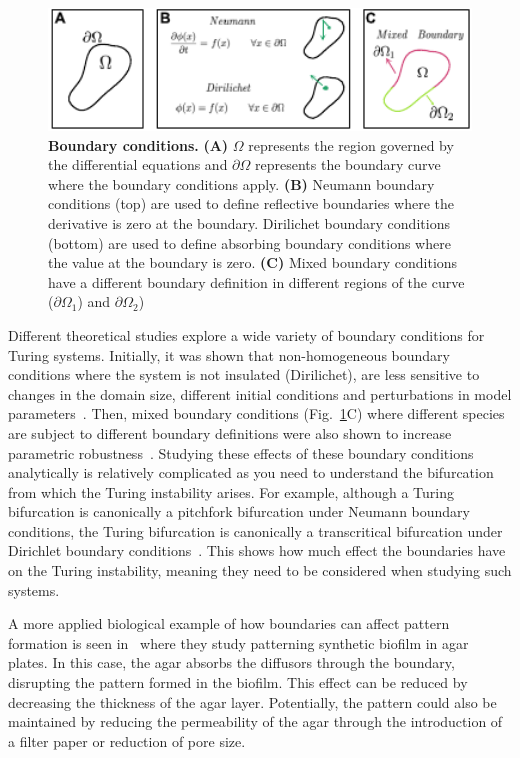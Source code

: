 \begin{figure}[H]
    \centering
    \includegraphics[width=1\textwidth]{chapters/Introduction/boundaries}
    \caption{\textbf{Boundary conditions.} \textbf{(A)} $\Omega$ represents the region governed by the differential equations and $\partial\Omega$ represents the boundary curve where the boundary conditions apply. \textbf{(B)} Neumann boundary conditions (top) are used to define reflective boundaries where the derivative is zero at the boundary. Dirilichet boundary conditions (bottom) are used to define absorbing boundary conditions where the value at the boundary is zero. \textbf{(C)} Mixed boundary conditions have a different boundary definition in different regions of the curve ($\partial\Omega_1$) and $\partial\Omega_2$)  }
    \label{fig:boundaries}
\end{figure}

Different theoretical studies explore a wide variety of boundary conditions for Turing systems.
Initially, it was shown that non-homogeneous boundary conditions where the system is not insulated (Dirilichet), are less sensitive to changes in the domain size, different initial conditions and perturbations in model parameters~\parencite{Arcuri1986}.
Then, mixed boundary conditions (Fig.~\ref{fig:boundaries}C) where different species are subject to different boundary definitions were also shown to increase parametric robustness~\parencite{Maini1993, Maini1997, Krause2021}.
Studying these effects of these boundary conditions analytically is relatively complicated as you need to understand the bifurcation from which the Turing instability arises.
For example, although a Turing bifurcation is canonically a pitchfork bifurcation under Neumann boundary conditions, the Turing bifurcation is canonically a transcritical bifurcation under Dirichlet boundary conditions~\parencite{Woolley2022}. %
This shows how much effect the boundaries have on the Turing instability, meaning they need to be considered when studying such systems.

A more applied biological example of how boundaries can affect pattern formation is seen in~\parencite{Krause2020} where they study patterning synthetic biofilm in agar plates.
In this case, the agar absorbs the diffusors through the boundary, disrupting the pattern formed in the biofilm.
This effect can be reduced by decreasing the thickness of the agar layer.
Potentially, the pattern could also be maintained by reducing the permeability of the agar through the introduction of a filter paper or reduction of pore size.

